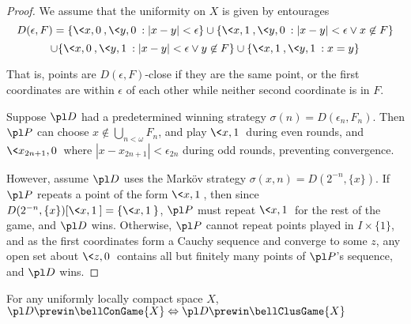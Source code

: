 \begin{proof}
  We assume that the uniformity on $X$ is given by entourages
  \[
    D(\epsilon,F) =
    \{\<x,0\>,\<y,0\>: |x-y|<\epsilon \}
      \cup
    \{\<x,1\>,\<y,0\>: |x-y|<\epsilon \vee x\not\in F\}
  \]
  \[
      \cup
    \{\<x,0\>,\<y,1\>: |x-y|<\epsilon \vee y\not\in F\}
      \cup
    \{\<x,1\>,\<y,1\>: x=y\}
  \]

  That is, points are $D(\epsilon,F)$-close if they are the same point, or
  the first coordinates are within $\epsilon$ of each other while neither
  second coordinate is in $F$.

  Suppose $\pl D$ had a predetermined winning strategy
  $\sigma(n)=D(\epsilon_n,F_n)$. Then
  $\pl P$ can choose $x\not\in \bigcup_{n<\omega} F_n$, and play $\<x,1\>$
  during even rounds, and $\<x_{2n+1},0\>$ where $|x-x_{2n+1}|<\epsilon_{2n}$
  during odd rounds, preventing convergence.

  However, assume $\pl D$ uses the Mark\"ov strategy
  $\sigma(x,n)=D(2^{-n},\{x\})$.
  If $\pl P$ repeats a point of the form $\<x,1\>$, then since
  $D(2^{-n},\{x\})[\<x,1\>]=\{\<x,1\>\}$, $\pl P$ must repeat $\<x,1\>$ for
  the rest of the game, and $\pl D$ wins. Otherwise, $\pl P$ cannot repeat
  points played in $I\times\{1\}$, and as the first
  coordinates form a Cauchy sequence and converge to some $z$, any open set
  about $\<z,0\>$ contains all but finitely many points of $\pl P$'s sequence,
  and $\pl D$ wins.
\end{proof}

\begin{thm}
  For any uniformly locally compact space $X$,
      $\pl D\prewin \bellConGame{X} \Leftrightarrow \pl D\prewin \bellClusGame{X}$
\end{thm}

